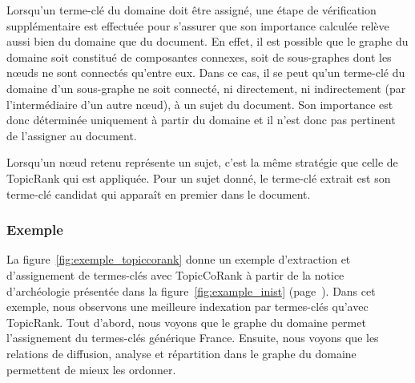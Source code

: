         Lorsqu'un terme-clé du domaine doit être assigné, une étape de
        vérification supplémentaire est effectuée pour s'assurer que son
        importance calculée relève aussi bien du domaine que du document. En
        effet, il est possible que le graphe du domaine soit constitué de
        composantes connexes, soit de sous-graphes dont les n\oe{}uds ne sont
        connectés qu'entre eux. Dans ce cas, il se peut qu'un terme-clé du
        domaine d'un sous-graphe ne soit connecté, ni directement, ni
        indirectement (par l'intermédiaire d'un autre n\oe{}ud), à un sujet du
        document. Son importance est donc déterminée uniquement à partir du
        domaine et il n'est donc pas pertinent de l'assigner au document.

        Lorsqu'un n\oe{}ud retenu représente un sujet, c'est la même stratégie
        que celle de Topic\-Rank qui est appliquée. Pour un sujet donné, le
        terme-clé extrait est son terme-clé candidat qui apparaît en premier
        dans le document.

      \subsubsection{Exemple}
      \label{subsubsec:main-domain_specific_keyphrase_annotation-supervised_automatic_keyphrase_extraction-topiccorank-exemple}
        La figure~\ref{fig:exemple_topiccorank} donne un exemple d'extraction
        et d'assignement de
        termes-clés avec TopicCoRank à partir de la notice d'archéologie
        présentée dans la figure~\ref{fig:example_inist} (page~\pageref{fig:example_inist}). Dans cet exemple,
        nous observons une meilleure indexation par termes-clés qu'avec
        TopicRank. Tout d'abord, nous voyons que le graphe du domaine permet
        l'assignement du termes-clés générique \og{}France\fg{}. Ensuite, nous
        voyons que les relations de \og{}diffusion\fg{}, \og{}analyse\fg{} et
        \og{}répartition\fg{} dans le graphe du domaine permettent de mieux les
        ordonner.
        

